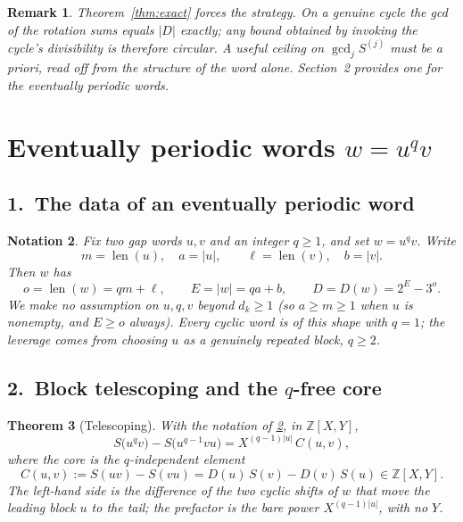 \documentclass[11pt,a4paper]{article}
\theoremstyle{bourbaki}
\newtheorem{thm}{Theorem}[section]
\theoremstyle{bourbakidef}
\newtheorem{rem}[thm]{Remark}
\newtheorem{nota}[thm]{Notation}
\newcommand{\Z}{\mathbb{Z}}
\DeclareMathOperator{\len}{len}
\begin{document}
\begin{rem}\label{rem:apriori}
Theorem~\ref{thm:exact} forces the strategy. On a genuine cycle the gcd of the rotation
sums equals $\lvert D\rvert$ \emph{exactly}; any bound obtained by invoking the cycle's
divisibility is therefore circular. A useful ceiling on $\gcd_{j}S^{(j)}$ must be
\emph{a priori}, read off from the structure of the word alone. Section~2 provides one for
the eventually periodic words.
\end{rem}

\section{Eventually periodic words $w=u^{q}v$}

\subsection*{1.\ The data of an eventually periodic word}

\begin{nota}\label{nota:uqv}
Fix two gap words $u,v$ and an integer $q\ge 1$, and set $w=u^{q}v$. Write
\[
   m=\len(u),\quad a=\lvert u\rvert,\qquad \ell=\len(v),\quad b=\lvert v\rvert .
\]
Then $w$ has
\[
   o=\len(w)=qm+\ell,\qquad E=\lvert w\rvert=qa+b,\qquad D=D(w)=2^{E}-3^{o}.
\]
We make \emph{no} assumption on $u,q,v$ beyond $d_{k}\ge 1$ (so $a\ge m\ge 1$ when $u$ is
nonempty, and $E\ge o$ always). Every cyclic word is of this shape with $q=1$; the leverage
comes from choosing $u$ as a genuinely repeated block, $q\ge 2$.
\end{nota}

\subsection*{2.\ Block telescoping and the $q$-free core}

\begin{thm}[Telescoping]\label{thm:telescope}
With the notation of \ref{nota:uqv}, in $\Z[X,Y]$,
\begin{equation}\label{eq:telescope}
   S\bigl(u^{q}v\bigr)-S\bigl(u^{q-1}vu\bigr)
   =X^{(q-1)\lvert u\rvert}\,C(u,v),
\end{equation}
where the \emph{core} is the $q$-independent element
\begin{equation}\label{eq:core}
   C(u,v):=S(uv)-S(vu)=D(u)\,S(v)-D(v)\,S(u)\in\Z[X,Y].
\end{equation}
The left-hand side is the difference of the two cyclic shifts of $w$ that move the leading
block $u$ to the tail; the prefactor is the bare power $X^{(q-1)\lvert u\rvert}$, with no
$Y$.
\end{thm}
\end{document}
